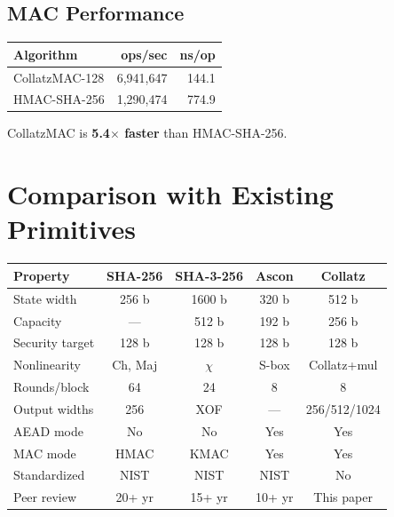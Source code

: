 \documentclass[11pt,a4paper]{article}
\newcommand{\toprule}{\hline}
\newcommand{\midrule}{\hline}
\newcommand{\bottomrule}{\hline}
\begin{document}
\subsection{MAC Performance}

\begin{center}
\begin{tabular}{|l|r|r|}
\toprule
\textbf{Algorithm} & \textbf{ops/sec} & \textbf{ns/op} \\
\midrule
CollatzMAC-128 & 6,941,647  & 144.1 \\
HMAC-SHA-256   & 1,290,474  & 774.9 \\
\bottomrule
\end{tabular}
\end{center}

CollatzMAC is \textbf{5.4$\times$ faster} than HMAC-SHA-256.

\section{Comparison with Existing Primitives}
\label{sec:comparison}

\begin{center}
\begin{tabular}{|l|c|c|c|c|}
\toprule
\textbf{Property} & \textbf{SHA-256} & \textbf{SHA-3-256} & \textbf{Ascon} & \textbf{Collatz} \\
\midrule
State width        & 256 b   & 1600 b  & 320 b  & 512 b \\
Capacity           & ---     & 512 b   & 192 b  & 256 b \\
Security target    & 128 b   & 128 b   & 128 b  & 128 b \\
Nonlinearity       & Ch, Maj & $\chi$  & S-box  & Collatz+mul \\
Rounds/block       & 64      & 24      & 8      & 8 \\
Output widths      & 256     & XOF     & ---    & 256/512/1024 \\
AEAD mode          & No      & No      & Yes    & Yes \\
MAC mode           & HMAC    & KMAC    & Yes    & Yes \\
Standardized       & NIST    & NIST    & NIST   & No \\
Peer review        & 20+ yr  & 15+ yr  & 10+ yr & This paper \\
\bottomrule
\end{tabular}
\end{center}
\end{document}
